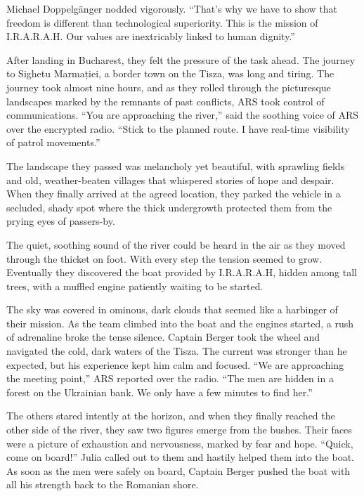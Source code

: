 \documentclass[
]{article}
\begin{document}
Michael Doppelgänger nodded vigorously. ``That's why we have to show
that freedom is different than technological superiority. This is the
mission of I.R.A.R.A.H. Our values \hspace{0pt}\hspace{0pt}are
inextricably linked to human dignity.''

After landing in Bucharest, they felt the pressure of the task ahead.
The journey to Sighetu Marmației, a border town on the Tisza, was long
and tiring. The journey took almost nine hours, and as they rolled
through the picturesque landscapes marked by the remnants of past
conflicts, ARS took control of communications. ``You are approaching the
river,'' said the soothing voice of ARS over the encrypted radio.
``Stick to the planned route. I have real-time visibility of patrol
movements.''

The landscape they passed was melancholy yet beautiful, with sprawling
fields and old, weather-beaten villages that whispered stories of hope
and despair. When they finally arrived at the agreed location, they
parked the vehicle in a secluded, shady spot where the thick undergrowth
protected them from the prying eyes of passers-by.

The quiet, soothing sound of the river could be heard in the air as they
moved through the thicket on foot. With every step the tension seemed to
grow. Eventually they discovered the boat provided by I.R.A.R.A.H,
hidden among tall trees, with a muffled engine patiently waiting to be
started.

The sky was covered in ominous, dark clouds that seemed like a harbinger
of their mission. As the team climbed into the boat and the engines
started, a rush of adrenaline broke the tense silence. Captain Berger
took the wheel and navigated the cold, dark waters of the Tisza. The
current was stronger than he expected, but his experience kept him calm
and focused. ``We are approaching the meeting point,'' ARS reported over
the radio. ``The men are hidden in a forest on the Ukrainian bank. We
only have a few minutes to find her.''

The others stared intently at the horizon, and when they finally reached
the other side of the river, they saw two figures emerge from the
bushes. Their faces were a picture of exhaustion and nervousness, marked
by fear and hope. ``Quick, come on board!'' Julia called out to them and
hastily helped them into the boat. As soon as the men were safely on
board, Captain Berger pushed the boat with all his strength back to the
Romanian shore.
\end{document}
